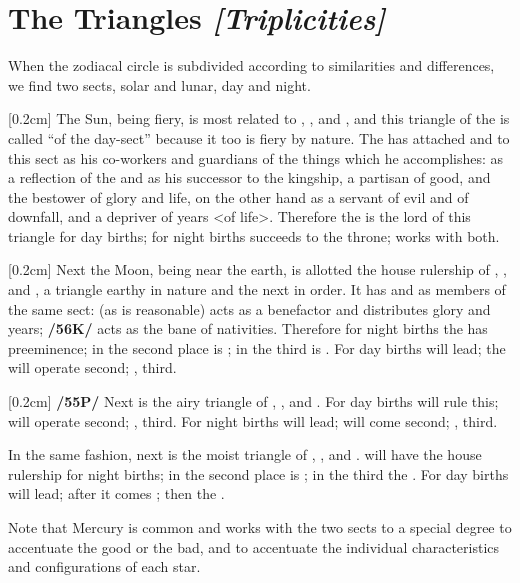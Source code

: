 \section{The Triangles \textit{[Triplicities]}}

When the zodiacal circle is subdivided according to similarities and differences, we find two sects, solar and lunar, day and night. 

[0.2cm]
The Sun, being fiery, is most related to \Aries, \Leo, and \Sagittarius, and this triangle of the \Sun\xspace is called “of the day-sect” because it too is fiery by nature. The \Sun\xspace has attached \Jupiter\xspace and \Saturn\xspace to this sect as his co-workers and guardians of the things which he accomplishes: \Jupiter\xspace as a reflection of the \Sun\xspace and as his successor to the kingship, a partisan of good, and the bestower of glory
and life, \Saturn\xspace on the other hand as a servant of evil and of downfall, and a depriver of years <of life>. Therefore the \Sun\xspace is the lord of this triangle for day births; for night births \Jupiter\xspace succeeds to the throne; \Saturn\xspace works with both.

[0.2cm]
Next the Moon, being near the earth, is allotted the house rulership of \Taurus, \Virgo, and \Capricorn, a triangle earthy in nature and the next in order. It has \Venus\xspace and \Mars\xspace as members of the same sect: \Venus\xspace
(as is reasonable) acts as a benefactor and distributes glory and years; \textbf{/56K/} \Mars\xspace acts as the bane of
nativities. Therefore for night births the \Moon\xspace has preeminence; in the second place is \Venus; in the third
is \Mars. For day births \Venus\xspace will lead; the \Moon\xspace will operate second; \Mars, third.

[0.2cm]
\textbf{/55P/} Next is the airy triangle of \Gemini, \Libra, and \Aquarius. For day births \Saturn\xspace will rule this;
\Mercury\xspace will operate second; \Jupiter, third. For night births \Mercury\xspace will lead; \Saturn\xspace will come second; \Jupiter, third.

In the same fashion, next is the moist triangle of \Cancer, \Scorpio, and \Pisces. \Mars\xspace will have the house rulership for night births; in the second place is \Venus; in the third the \Moon. For day births \Venus\xspace will lead; after it comes \Mars; then the \Moon. 

\mndl[0.2cm]
Note that Mercury is common and works with the two sects to a special degree to accentuate the good or the bad, and to accentuate the individual characteristics and configurations of each star.

\newpage
